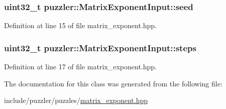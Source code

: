 \subsubsection[{seed}]{\setlength{\rightskip}{0pt plus 5cm}uint32\+\_\+t puzzler\+::\+Matrix\+Exponent\+Input\+::seed}\label{a00015_a9214343038a67f5edcdd0c8fd05b4696}


Definition at line 15 of file matrix\+\_\+exponent.\+hpp.

\hypertarget{a00015_aaf0ed0e65e4de2cd3b86532463c8f707}{}
\subsubsection[{steps}]{\setlength{\rightskip}{0pt plus 5cm}uint32\+\_\+t puzzler\+::\+Matrix\+Exponent\+Input\+::steps}\label{a00015_aaf0ed0e65e4de2cd3b86532463c8f707}


Definition at line 17 of file matrix\+\_\+exponent.\+hpp.



The documentation for this class was generated from the following file\+:\begin{DoxyCompactItemize}
\item 
include/puzzler/puzzles/\hyperlink{a00131}{matrix\+\_\+exponent.\+hpp}\end{DoxyCompactItemize}
